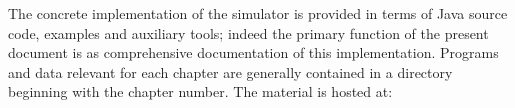 The concrete implementation of the simulator is provided in terms of
Java source code, examples and auxiliary tools; indeed the primary
function of the present document is as comprehensive documentation of
this implementation. Programs and data relevant for each chapter are
generally contained in a directory beginning with the chapter number.
The material is hosted at:\\
